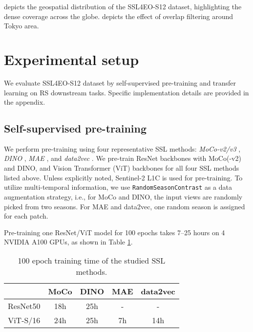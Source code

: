 \documentclass[lettersize,journal]{IEEEtran}
\begin{document}
 depicts the geospatial distribution of the SSL4EO-S12 dataset, highlighting the dense coverage across the globe.  depicts the effect of overlap filtering around Tokyo area. 


\vspace{-0.5em}
\section{Experimental setup}
\label{sec:setup}
We evaluate SSL4EO-S12 dataset by self-supervised pre-training and transfer learning on RS downstream tasks. Specific implementation details are provided in the appendix.

\subsection{Self-supervised pre-training} We perform pre-training using four representative SSL methods: \textit{MoCo-v2/v3} \citep{chen2020improved,chen2021empirical}, \textit{DINO} \citep{caron2021emerging}, \textit{MAE} \citep{he2021masked}, and \textit{data2vec} \citep{baevski2022data2vec}.
We pre-train ResNet \citep{he2016deep} backbones with MoCo(-v2) and DINO, and Vision Transformer (ViT) \citep{dosovitskiy2020image} backbones for all four SSL methods listed above. Unless explicitly noted, Sentinel-2 L1C is used for pre-training.
To utilize multi-temporal information, we use \texttt{RandomSeasonContrast} as a data augmentation strategy, i.e., for MoCo and DINO, the input views are randomly picked from two seasons. For MAE and data2vec, one random season is assigned for each patch.

Pre-training one ResNet/ViT model for 100 epochs takes 7--25 hours on 4 NVIDIA A100 GPUs, as shown in Table \ref{tab:pretraintime}.

\begin{table}[h!]
\centering
\caption{100 epoch training time of the studied SSL methods.}
\label{tab:pretraintime}
\begin{tabular}{ccccc}
\hline
& MoCo & DINO & MAE & data2vec            \\ \hline \hline
ResNet50 & 18h  & 25h  & -   & -                   \\
ViT-S/16 & 24h  & 25h  & 7h  & 14h \\ \hline
\end{tabular}
\vspace{-1em}
\end{table}
\end{document}
